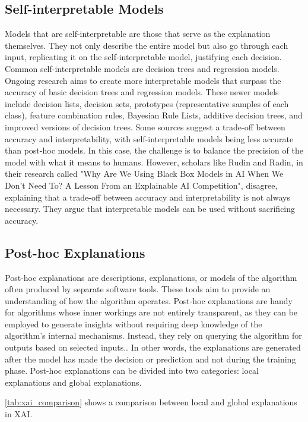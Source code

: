 \documentclass[10pt,journal,compsoc]{IEEEtran}
\begin{document}
\subsection{Self-interpretable Models}
Models that are self-interpretable are those that serve as the explanation themselves. They not only describe the entire model but also go through each input, replicating it on the self-interpretable model, justifying each decision.
Common self-interpretable models are decision trees and regression models. Ongoing research aims to create more interpretable models that surpass the accuracy of basic decision trees and regression models. These newer models include decision lists, decision sets, prototypes (representative samples of each class), feature combination rules, Bayesian Rule Lists, additive decision trees, and improved versions of decision trees.\cite{phillips2020four}
Some sources suggest a trade-off between accuracy and interpretability, with self-interpretable models being less accurate than post-hoc models. In this case, the challenge is to balance the precision of the model with what it means to humans. However, scholars like Rudin\cite{rudin} and Radin\cite{radin}, in their research called "Why Are We Using Black Box Models in AI When We Don’t Need To? A Lesson From an Explainable AI Competition", disagree, 
explaining that a trade-off between accuracy and interpretability is not always necessary. They argue that interpretable models can be used without sacrificing accuracy. \cite{phillips2020four}

\subsection{Post-hoc Explanations}
Post-hoc explanations are descriptions, explanations, or models of the algorithm often produced by separate software tools. These tools aim to provide an understanding of how the algorithm operates. Post-hoc explanations are handy for algorithms whose inner workings are not entirely transparent, as they can be employed to generate insights without requiring deep knowledge of the algorithm's internal mechanisms. Instead, they rely on querying the algorithm for outputs based on selected inputs.\cite{phillips2020four}.
In other words, the explanations are generated after the model has made the decision or prediction and not during the training phase. 
Post-hoc explanations can be divided into two categories: local explanations and global explanations. 

\autoref*{tab:xai_comparison} shows a comparison between local and global explanations in XAI.
 
\end{document}
